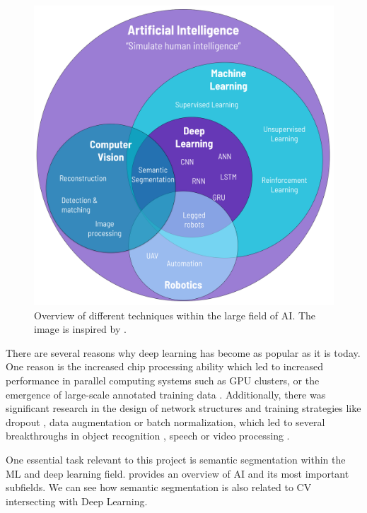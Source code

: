 \begin{figure}[H]%
    \centering
    \includegraphics[width=\imgWidthM]{images/AI_Overview.png}
    \caption[\acf{AI} overview]{Overview of different techniques within the large field of \acf{AI}. The image is inspired by \cite{HUANG2021103677}.}
    \label{AI_Overview}
\end{figure}

There are several reasons why deep learning has become as popular as it is today. One reason is the increased chip processing ability which led to increased performance in parallel computing systems such as GPU clusters, or the emergence of large-scale annotated training data \cite{deng2014deep}\cite{DBLP:journals/corr/abs-1807-05511}\cite{chen2016supervised}. Additionally, there was significant research in the design of network structures and training strategies like dropout \cite{gal2016dropout}, data augmentation \cite{shorten2019survey} or batch normalization\cite{ioffe2015batch}, which led to several breakthroughs in object recognition \cite{10.1145/3448250}, speech \cite{10.1145/3448250} or video processing \cite{LeCun2015}.

One essential task relevant to this project is semantic segmentation within the \ac{ML} and deep learning field.  provides an overview of \ac{AI} and its most important subfields. We can see how semantic segmentation is also related to \acf{CV} intersecting with Deep Learning.

